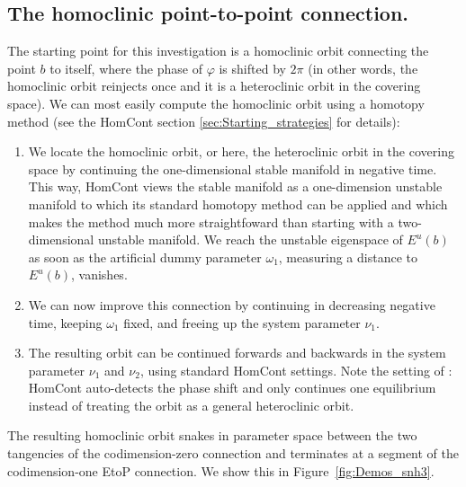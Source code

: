 \documentclass[12pt]{report}
\begin{document}
\subsection{The homoclinic point-to-point connection.}
The starting point for this investigation is a homoclinic orbit
connecting the point $b$ to itself, where the phase of $\varphi$ is
shifted by $2\pi$ (in other words, the homoclinic orbit reinjects
once and it is a heteroclinic orbit in the covering space).
We can most easily compute the homoclinic orbit using a 
homotopy method
(see the {\cal HomCont} section \ref{sec:Starting_strategies} for details):

\begin{enumerate}
\item
We locate the homoclinic orbit, or here, the heteroclinic orbit in the
covering space by continuing the one-dimensional stable manifold in
negative time. This way, {\cal HomCont} views the stable manifold as a
one-dimension unstable manifold to which its standard homotopy method
can be applied and which makes the method much more straightfoward
than starting with a two-dimensional unstable manifold.
We reach the unstable eigenspace of $E^u(b)$ as soon as the artificial
dummy parameter $\omega_1$, measuring a distance to $E^u(b)$, vanishes.
\item
We can now improve this connection by continuing in decreasing negative time,
keeping $\omega_1$ fixed, and freeing up the system parameter $\nu_1$.
\item
The resulting orbit can be continued forwards and backwards in the
system parameter $\nu_1$ and $\nu_2$, using standard {\cal HomCont} settings.
Note the setting of : {\cal HomCont} auto-detects the phase
shift and only continues one equilibrium instead of treating
the orbit as a general heteroclinic orbit.
\end{enumerate}

The resulting homoclinic orbit snakes in parameter space between the two
tangencies of the codimension-zero connection and terminates at a
segment of the codimension-one EtoP connection. We show this in
Figure~\ref{fig:Demos_snh3}.
\end{document}
